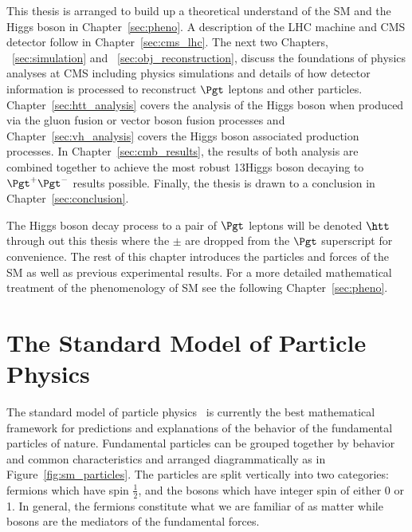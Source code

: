 This thesis is arranged to build up a theoretical understand of the SM and the
Higgs boson in Chapter~\ref{sec:pheno}. A description of the LHC machine and
CMS detector follow in Chapter~\ref{sec:cms_lhc}. The next two Chapters, ~\ref{sec:simulation} and
~\ref{sec:obj_reconstruction}, discuss the foundations of physics analyses at CMS including physics
simulations and details of how detector information is processed to reconstruct $\Pgt$
leptons and other particles. Chapter~\ref{sec:htt_analysis} covers the analysis
of the Higgs boson when produced via the gluon fusion or vector boson fusion
processes and Chapter~\ref{sec:vh_analysis} covers the Higgs boson associated
production processes. In Chapter~\ref{sec:cmb_results}, the results of
both analysis are combined together to achieve the most robust 13\TeV Higgs
boson decaying to $\Pgt^{+}\Pgt^{-}$ results possible. Finally, the thesis
is drawn to a conclusion in Chapter~\ref{sec:conclusion}.

The Higgs boson decay process to a pair of $\Pgt$ leptons will be denoted
$\htt$ through out this thesis where the $\pm$ are dropped from the $\Pgt$ superscript
for convenience.
The rest of this chapter introduces the particles and forces of the SM as well
as previous experimental results. For a more detailed mathematical treatment
of the phenomenology of SM see the following Chapter~\ref{sec:pheno}.


\section{The Standard Model of Particle Physics}
The standard model of particle physics~\cite{Glashow:1961tr,SM1,SM3} is currently
the best mathematical framework for predictions and explanations of the behavior
of the fundamental particles of nature. Fundamental particles can be grouped
together by behavior and common characteristics and arranged diagrammatically as in
Figure~\ref{fig:sm_particles}. The particles are split vertically into two categories:
fermions which have spin $\frac{1}{2}$, and the bosons which have integer
spin of either 0 or 1. In general, the fermions constitute what we are familiar of
as matter while bosons are the mediators of the fundamental forces.

